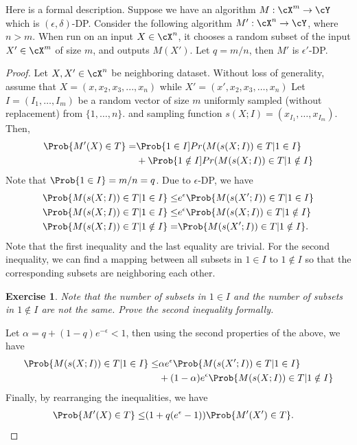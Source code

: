 \documentclass[11pt, a4paper]{article}
\newtheorem{exercise}{Exercise}
\begin{document}
Here is a formal description.
Suppose we have an algorithm $M : \cX^m \rightarrow \cY$ which is $(\epsilon, \delta)$-DP.
Consider the following algorithm $M':\cX^n\rightarrow \cY$, where $n > m$.
When run on an input $X \in\cX^n$, it chooses a random subset of the input $X'\in\cX^m$ of size $m$, and outputs $M(X')$.
Let $q= m/n$, then $M'$ is $\epsilon'$-DP.\\
\begin{proof}
Let $X, X'\in \cX^n$ be neighboring dataset.
Without loss of generality, assume that $X= (x, x_2, x_3, ..., x_n)$ while $X'=(x', x_2, x_3, \dots, x_n)$
Let $I=(I_1, \dots, I_m)$ be a random vector of size $m$ uniformly sampled (without replacement) from $\{1, \dots, n\}$.
and sampling function $s(X;I) = (x_{I_1}, \dots, x_{I_m})$.
Then,
\begin{align*}
    \Prob{M'(X)\in T} =& \Prob{1\in I] Pr(M(s(X;I))\in T|1\in I}\\
    &+ \Prob{1\notin I] Pr(M(s(X;I))\in T|1\notin I}
\end{align*}
Note that $\Prob{1\in I} = m/n=q$.
Due to $\epsilon$-DP, we have
\begin{align*}
\Prob{M(s(X;I))\in T|1\in I} \leq& e^\epsilon \Prob{M(s(X';I))\in T|1\in I}\\
\Prob{M(s(X;I))\in T|1\in I} \leq& e^\epsilon \Prob{M(s(X;I))\in T|1\notin I}\\
\Prob{M(s(X;I))\in T|1\notin I} =& \Prob{M(s(X';I))\in T|1\notin I}.
\end{align*}
Note that the first inequality and the last equality are trivial.
For the second inequality, we can find a mapping between all subsets in $1\in I$ to $1\notin I$
so that the corresponding subsets are neighboring each other.

\begin{exercise}
    Note that the number of subsets in $1\in I$ and the number of subsets in $1\notin I$ are not the same.
    Prove the second inequality formally.
\end{exercise}


Let $\alpha = q + (1-q)e^{-\epsilon}<1$, then using the second properties of the above, we have
\begin{align*}
\Prob{M(s(X;I))\in T|1\in I} \leq& \alpha e^\epsilon \Prob{M(s(X';I))\in T|1\in I} \\
&+ (1-\alpha) e^\epsilon \Prob{M(s(X;I))\in T|1\notin I} 
\end{align*}
Finally, by rearranging the inequalities, we have
\begin{align*}
    \Prob{M'(X)\in T} \leq &(1+q(e^\epsilon-1)) \Prob{M'(X')\in T}.
\end{align*}
\end{proof}
\end{document}
